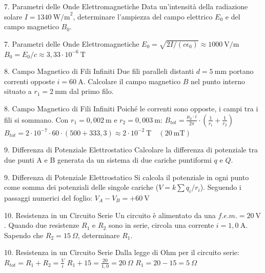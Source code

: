 \documentclass[a4paper]{article}
\begin{document}
\begin{snippetexercise}{7. Parametri delle Onde Elettromagnetiche}
    Data un'intensità della radiazione solare \(I=1340~\mathrm{W/m}^{2}\), determinare l'ampiezza del campo elettrico \(E_{0}\) e del campo magnetico \(B_{0}\).
\end{snippetexercise}
\begin{snippetsolution}{7. Parametri delle Onde Elettromagnetiche}
    \(E_{0} = \sqrt{2I/(c\epsilon_{0})} \approx 1000~\mathrm{V/m}\)
    \(B_{0} = E_{0}/c \approx 3,33\cdot10^{-6}~\mathrm{T}\)
\end{snippetsolution}
\begin{snippetexercise}{8. Campo Magnetico di Fili Infiniti}
    Due fili paralleli distanti \(d=5~\mathrm{mm}\) portano correnti opposte \(i=60~\mathrm{A}\). Calcolare il campo magnetico \(B\) nel punto interno situato a \(r_{1}=2~\mathrm{mm}\) dal primo filo.
\end{snippetexercise}
\begin{snippetsolution}{8. Campo Magnetico di Fili Infiniti}
    Poiché le correnti sono opposte, i campi tra i fili si sommano. Con \(r_{1}=0,002~\mathrm{m}\) e \(r_{2}=0,003~\mathrm{m}\):
    \(B_{tot} = \frac{\mu_{0} \cdot i}{2\pi} \cdot \left(\frac{1}{r_{1}} + \frac{1}{r_{2}}\right)\)
    \(B_{tot} = 2\cdot10^{-7} \cdot 60 \cdot (500 + 333,3) \approx 2\cdot10^{-2}~\mathrm{T} \quad (20~\mathrm{mT})\)
\end{snippetsolution}
\begin{snippetexercise}{9. Differenza di Potenziale Elettrostatico}
    Calcolare la differenza di potenziale tra due punti A e B generata da un sistema di due cariche puntiformi \(q\) e \(Q\).
\end{snippetexercise}
\begin{snippetsolution}{9. Differenza di Potenziale Elettrostatico}
    Si calcola il potenziale in ogni punto come somma dei potenziali delle singole cariche (\(V=k\sum q_{i}/r_{i}\)). Seguendo i passaggi numerici del foglio:
    \(V_{A} - V_{B} = +60~\mathrm{V}\)
\end{snippetsolution}
\begin{snippetexercise}{10. Resistenza in un Circuito Serie}
    Un circuito è alimentato da una \(f.e.m.=20~\mathrm{V}\). Quando due resistenze \(R_{1}\) e \(R_{2}\) sono in serie, circola una corrente \(i=1,0~\mathrm{A}\). Sapendo che \(R_{2}=15~\Omega\), determinare \(R_{1}\).
\end{snippetexercise}
\begin{snippetsolution}{10. Resistenza in un Circuito Serie}
    Dalla legge di Ohm per il circuito serie:
    \(R_{tot} = R_{1} + R_{2} = \frac{V}{i}\)
    \(R_{1} + 15 = \frac{20}{1,0} = 20~\Omega\)
    \(R_{1} = 20 - 15 = 5~\Omega\)
\end{snippetsolution}
\end{document}
